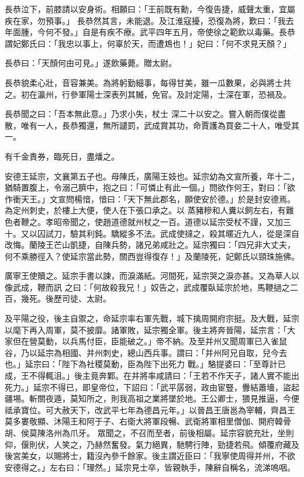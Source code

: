 \begin{pinyinscope}
 長恭泣下，前膝請以安身術。相願曰：「王前既有勳，今復告捷，威聲太重，宜屬疾在家，勿預事。」
 長恭然其言，未能退。及江淮寇擾，恐復為將，歎曰：「我去年面腫，今何不發。」自是有疾不療。武平四年五月，帝使徐之範飲以毒藥。長恭謂妃鄭氏曰：「我忠以事上，何辜於天，而遭鴆也！」妃曰：「何不求見天顏？」



 長恭曰：「天顏何由可見。」遂飲藥薨。贈太尉。



 長恭貌柔心壯，音容兼美。為將躬勤細事，每得甘美，雖一瓜數果，必與將士共之。初在瀛州，行參軍陽士深表列其贓，免官。及討定陽，士深在軍，恐禍及。



 長恭聞之曰：「吾本無此意。」乃求小失，杖士
 深二十以安之。嘗入朝而僕從盡散，唯有一人，長恭獨還，無所譴罰，武成賞其功，命賈護為買妾二十人，唯受其一。



 有千金責券，臨死日，盡燔之。



 安德王延宗，文襄第五子也。母陳氏，廣陽王妓也。延宗幼為文宣所養，年十二，猶騎置腹上，令溺己臍中，抱之曰：「可憐止有此一個。」問欲作何王，對曰：「欲作衝天王。」文宣問楊愔，愔曰：「天下無此郡名，願使安於德。」於是封安德焉。為定州刺史，於樓上大便，使人在下張口承之。以
 蒸豬糝和人糞以飼左右，有難色者鞭之。孝昭帝聞之，使趙道德就州杖之一百。道德以延宗受杖不謹，又加三十。又以囚試刀，驗其利鈍。驕縱多不法。武成使撻之，殺其暱近九人，從是深自改悔。蘭陵王芒山凱捷，自陳兵勢，諸兄弟咸壯之。延宗獨曰：「四兄非大丈夫，何不乘勝徑入？使延宗當此勢，關西豈得復存！」及蘭陵死，妃鄭氏以頸珠施佛。



 廣寧王使贖之。延宗手書以諫，而淚滿紙。河間死，延宗哭之淚亦甚。又為草人以像武成，鞭而訊
 之曰：「何故殺我兄！」奴告之，武成覆臥延宗於地，馬鞭撾之二百，幾死。後歷司徒、太尉。



 及平陽之役，後主自禦之，命延宗率右軍先戰，城下擒周開府宗挺。及大戰，延宗以麾下再入周軍，莫不披靡。諸軍敗，延宗獨全軍。後主將奔晉陽，延宗言：「大家但在營莫動，以兵馬付臣，臣能破之。」帝不納。及至并州又聞周軍已入雀鼠谷，乃以延宗為相國、并州刺史，總山西兵事。謂曰：「并州阿兄自取，兒今去也。」延宗曰：「陛下為社稷莫動，臣為陛下出死力
 戰。」駱提婆曰：「至尊計已成，王不得輒沮。」後主竟奔鄴。在并將率咸請曰：「王若不作天子，諸人實不能出死力。」延宗不得已，即皇帝位，下詔曰：「武平孱弱，政由宦豎，釁結蕭墻，盜起疆埸。斬關夜遁，莫知所之，則我高祖之業將墜於地。王公卿士，猥見推逼，今便祗承寶位。可大赦天下，改武平七年為德昌元年。」以晉昌王唐邕為宰輔，齊昌王莫多婁敬顯、沐陽王和阿于子、右衛大將軍段暢、武衛將軍相里僧伽、開府韓骨胡、侯莫陳洛州為爪牙。
 眾聞之，不召而至者，前後相屬。延宗容貌充壯，坐則仰，偃則伏，人笑之，乃赫然奮發。氣力絕異，馳騁行陣，勁捷若飛。傾覆府藏及後宮美女，以賜將士，籍沒內參千餘家。後主謂近臣曰：「我寧使周得并州，不欲安德得之。」左右曰：「理然。」延宗見士卒，皆親執手，陳辭自稱名，流涕嗚咽。




\end{pinyinscope}

